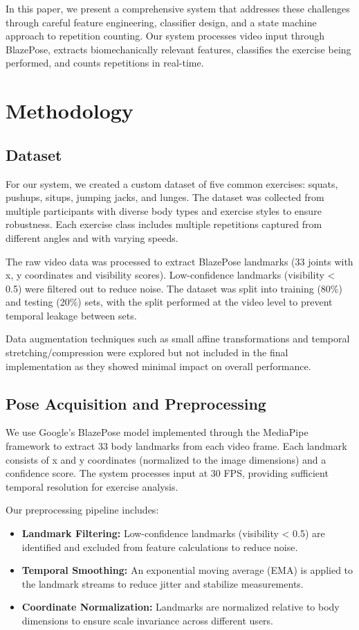\documentclass[conference]{IEEEtran}
\begin{document}
In this paper, we present a comprehensive system that addresses these challenges through careful feature engineering, classifier design, and a state machine approach to repetition counting. Our system processes video input through BlazePose, extracts biomechanically relevant features, classifies the exercise being performed, and counts repetitions in real-time.

\section{Methodology}
\subsection{Dataset}
For our system, we created a custom dataset of five common exercises: squats, pushups, situps, jumping jacks, and lunges. The dataset was collected from multiple participants with diverse body types and exercise styles to ensure robustness. Each exercise class includes multiple repetitions captured from different angles and with varying speeds.

The raw video data was processed to extract BlazePose landmarks (33 joints with x, y coordinates and visibility scores). Low-confidence landmarks (visibility < 0.5) were filtered out to reduce noise. The dataset was split into training (80\%) and testing (20\%) sets, with the split performed at the video level to prevent temporal leakage between sets.

Data augmentation techniques such as small affine transformations and temporal stretching/compression were explored but not included in the final implementation as they showed minimal impact on overall performance.

\subsection{Pose Acquisition and Preprocessing}
We use Google's BlazePose model implemented through the MediaPipe framework to extract 33 body landmarks from each video frame. Each landmark consists of x and y coordinates (normalized to the image dimensions) and a confidence score. The system processes input at 30 FPS, providing sufficient temporal resolution for exercise analysis.

Our preprocessing pipeline includes:

\begin{itemize}
    \item \textbf{Landmark Filtering:} Low-confidence landmarks (visibility < 0.5) are identified and excluded from feature calculations to reduce noise.
    \item \textbf{Temporal Smoothing:} An exponential moving average (EMA) is applied to the landmark streams to reduce jitter and stabilize measurements.
    \item \textbf{Coordinate Normalization:} Landmarks are normalized relative to body dimensions to ensure scale invariance across different users.
\end{itemize}
\end{document}
